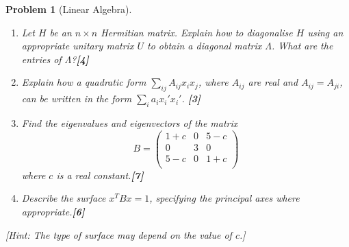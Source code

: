 \documentclass[a4paper]{article}
\theoremstyle{new}
\newtheorem{qns}{Problem}[section]
\begin{document}
\begin{qns}[Linear Algebra]\leavevmode
\begin{enumerate}[label=(\alph*)]
\item Let $H$ be an $n\times n$ Hermitian matrix. Explain how to diagonalise $H$ using an appropriate unitary matrix $U$ to obtain a diagonal matrix $\Lambda$. What are the entries of $\Lambda$?\hfill\textbf{[4]}
\item Explain how a quadratic form $\sum_{ij}A_{ij}x_ix_j$, where $A_{ij}$ are real and $A_{ij} = A_{ji}$, can be written in the form $\sum_ia_ix_i'x_i'$. \hfill\textbf{[3]}
\item Find the eigenvalues and eigenvectors of the matrix
$$B=\begin{pmatrix}1+c&0&5-c\\0&3&0\\5-c&0&1+c\\\end{pmatrix}$$
where $c$ is a real constant.\hfill\textbf{[7]}
\item Describe the surface $x^TBx = 1$, specifying the principal axes where appropriate.\hfill\textbf{[6]}
\end{enumerate}
[Hint: The type of surface may depend on the value of $c$.] \end{qns}
\end{document}
